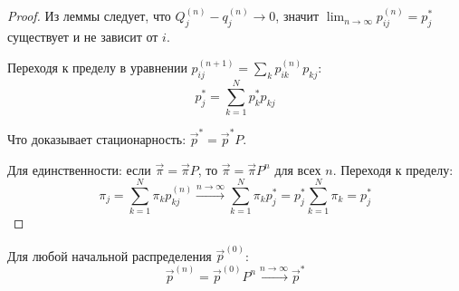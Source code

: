 \begin{proof}
Из леммы следует, что $Q_j^{(n)} - q_j^{(n)} \to 0$, значит $\lim_{n \to \infty} p_{ij}^{(n)} = p_j^*$ существует и не зависит от $i$.

Переходя к пределу в уравнении $p_{ij}^{(n+1)} = \sum_{k} p_{ik}^{(n)} p_{kj}$:
$$ p_j^* = \sum_{k=1}^{N} p_k^* p_{kj} $$

Что доказывает стационарность: $\vec{p}^* = \vec{p}^* P$.

Для единственности: если $\vec{\pi} = \vec{\pi} P$, то $\vec{\pi} = \vec{\pi} P^n$ для всех $n$. Переходя к пределу:
$$ \pi_j = \sum_{k=1}^{N} \pi_k p_{kj}^{(n)} \xrightarrow{n \to \infty} \sum_{k=1}^{N} \pi_k p_j^* = p_j^* \sum_{k=1}^{N} \pi_k = p_j^* $$
\end{proof}

\begin{note}
Для любой начальной распределения $\vec{p}^{(0)}$:
$$ \vec{p}^{(n)} = \vec{p}^{(0)} P^n \xrightarrow{n \to \infty} \vec{p}^* $$
\end{note}
